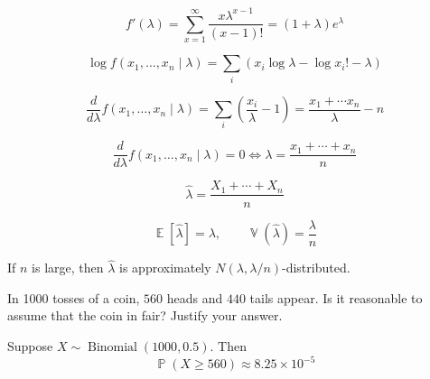 \documentclass{amsart}
\DeclareMathOperator{\Exp}{\mathbb{E}}
\DeclareMathOperator{\Var}{\mathbb{V}}
\DeclareMathOperator{\Prob}{\mathbb{P}}
\DeclareMathOperator{\Binomial}{Binomial}
\begin{document}
$$
f'(\lambda) = \sum_{x=1}^\infty \frac{x\lambda^{x - 1}}{(x - 1)!} = (1 + \lambda)e^{\lambda}
$$

$$
\log f(x_1,\ldots,x_n\mid\lambda) = \sum_i (x_i\log\lambda - \log x_i! - \lambda)
$$

$$
\frac{d}{d\lambda}f(x_1,\ldots,x_n\mid\lambda)
= \sum_i\left(\frac{x_i}{\lambda} - 1\right)
= \frac{x_1+\cdots x_n}{\lambda} - n
$$

$$
\frac{d}{d\lambda}f(x_1,\ldots,x_n\mid\lambda) = 0
\Longleftrightarrow \lambda = \frac{x_1+\cdots+x_n}n
$$

$$
\widehat\lambda = \frac{X_1+\cdots+X_n}n
$$

$$
\Exp[\widehat\lambda] = \lambda,\qquad
\Var(\widehat\lambda) = \frac\lambda n
$$

If $n$ is large, then $\widehat\lambda$ is approximately
$N(\lambda, \lambda/n)$-distributed.

In 1000 tosses of a coin, $560$ heads and $440$ tails appear.
Is it reasonable to assume that the coin in fair?
Justify your answer.

Suppose $X\sim \Binomial(1000, 0.5)$. Then
$$
\Prob(X \geq 560) \approx 8.25\times 10^{-5}
$$
\end{document}
